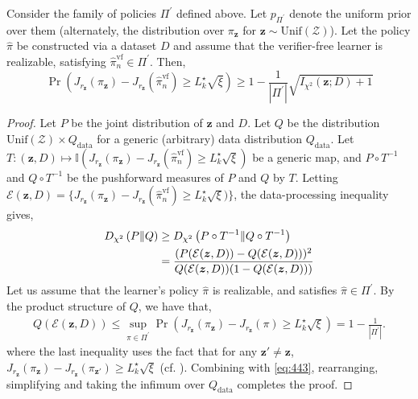 \begin{theorem}
Consider the family of policies $\Pi^\prime$ defined above. Let $p_{\Pi^\prime}$ denote the uniform prior over them (alternately, the distribution over $\pi_{\bm{z}}$ for $\bm{z} \sim \text{Unif} (\mathcal{Z})$). Let the policy $\hat{\pi}$ be constructed via a dataset $D$ and assume that the verifier-free learner is realizable, satisfying $\hat{\pi}_n^{\text{vf}} \in \Pi^\prime$. Then,
\begin{equation*}
    \Pr ( J_{r_{\bm{z}}} (\pi_{\bm{z}}) - J_{r_{\bm{z}}} (\hat{\pi}_n^{\text{vf}}) \ge L_k^\star\sqrt{\xi} ) \ge 1 - \frac{1}{|\Pi^\prime|} \sqrt{I_{\chi^2} (\bm{z}; D) + 1}
\end{equation*}
\end{theorem}
\begin{proof}
Let $P$ be the joint distribution of $\bm{z}$ and $D$. Let $Q$ be the distribution $\text{Unif} (\mathcal{Z}) \times Q_{\text{data}}$ for a generic (arbitrary) data distribution $Q_{\text{data}}$. Let $T : (\bm{z}, D) \mapsto \mathbb{I} ( J_{r_{\bm{z}}} (\pi_{\bm{z}}) - J_{r_{\bm{z}}} (\hat{\pi}_n^{\text{vf}}) \ge L_k^\star \sqrt{\xi})$ be a generic map, and $P \circ T^{-1}$ and $Q \circ T^{-1}$ be the pushforward measures of $P$ and $Q$ by $T$. Letting $\mathcal{E} (\bm{z},D) = \{ J_{r_{\bm{z}}} (\pi_{\bm{z}}) - J_{r_{\bm{z}}} (\hat{\pi}_n^{\text{vf}}) \ge L_k^\star \sqrt{\xi}) \}$, the data-processing inequality gives,
\begin{align}
    D_{\chi^2} \left( P \| Q \right) &\ge D_{\chi^2} \left( P \circ T^{-1} \| Q \circ T^{-1} \right) \nonumber\\
    &= \frac{(P (\mathcal{E} (\bm{z},D)) - Q (\mathcal{E} (\bm{z},D)))^2}{Q(\mathcal{E} (\bm{z},D))(1 - Q(\mathcal{E} (\bm{z},D)))} \label{eq:443}
\end{align}
Let us assume that the learner's policy $\hat{\pi}$ is realizable, and satisfies $\hat{\pi} \in \Pi^\prime$.
By the product structure of $Q$, we have that,
\begin{align*}
    Q(\mathcal{E} (\bm{z},D)) \le \sup_{\pi \in \Pi^\prime} \Pr \left( J_{r_{\bm{z}}} (\pi_{\bm{z}}) - J_{r_{\bm{z}}} (\pi) \ge L_k^\star \sqrt{\xi} \right) = 1-\frac{1}{|\Pi^\prime|}.
\end{align*}
where the last inequality uses the fact that for any $\bm{z}' \ne \bm{z}$, $J_{r_{\bm{z}}} (\pi_{\bm{z}}) - J_{r_{\bm{z}}} (\pi_{\bm{z}'}) \ge L_k^\star \sqrt{\xi}$ (cf. ). Combining with \cref{eq:443}, rearranging, simplifying and taking the infimum over $Q_{\text{data}}$ completes the proof.
\end{proof}

